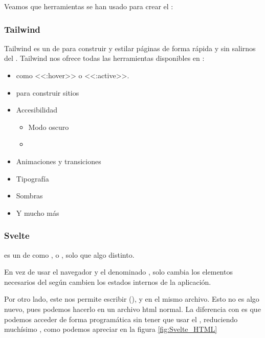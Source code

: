 Veamos que herramientas se han usado para crear el :

\subsubsection{Tailwind}

Tailwind es un  de  para construir y estilar páginas de forma rápida y sin salirnos del . Tailwind nos ofrece todas las herramientas disponibles en :
\begin{itemize}
  \item {} como <<:hover>> o <<:active>>.
  \item {} para construir sitios 
  \item Accesibilidad
        \begin{itemize}
          \item Modo oscuro
          \item {}
        \end{itemize}
  \item Animaciones y transiciones
  \item Tipografía
  \item Sombras
  \item Y mucho más
\end{itemize}

\subsubsection{Svelte}

 es un  de  como ,  o , solo que algo distinto.

En vez de usar el navegador y el denominado  ,  solo cambia los elementos necesarios del  según cambien los estados internos de la aplicación.

Por otro lado, este  nos permite escribir  (),  y  en el mismo archivo. Esto no es algo nuevo, pues podemos hacerlo en un archivo html normal. La diferencia con  es que podemos acceder de forma programática sin tener que usar el , reduciendo muchísimo , como podemos apreciar en la figura \ref{fig:Svelte_HTML}


